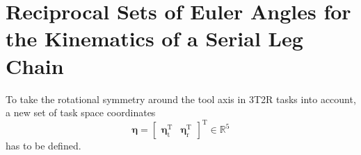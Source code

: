 \documentclass[robotics,article,submit,moreauthors,pdftex]{Definitions/mdpi}
\newcommand{\bm}[1]{\boldsymbol{#1}}
\newcommand{\transp}[0]{{\mathrm{T}}}
\begin{document}
\section{Reciprocal Sets of Euler Angles for the Kinematics of a Serial Leg Chain}
\label{sec:REW_seriell}


To take the rotational symmetry around the tool axis in 3T2R tasks into account, a new set of task space coordinates
%
\begin{equation}
\bm{\eta}
=
\begin{bmatrix}
\bm{\eta}_{\mathrm{t}}^\transp & 
\bm{\eta}_{\mathrm{r}}^\transp
\end{bmatrix}^\transp
\in {\mathbb{R}}^{5}
\end{equation}  
%
has to be defined.
\end{document}
